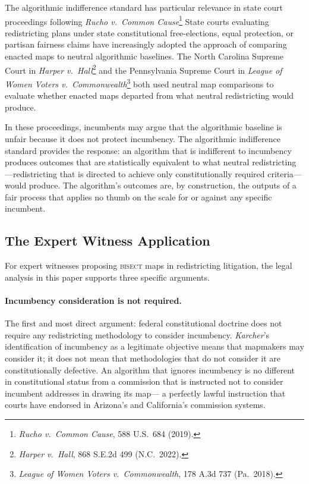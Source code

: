 The algorithmic indifference standard has particular relevance in state court proceedings
following \textit{Rucho v.\ Common Cause}\footnote{\textit{Rucho v.\ Common Cause},
588 U.S.\ 684 (2019).} State courts evaluating redistricting plans under state
constitutional free-elections, equal protection, or partisan fairness claims have
increasingly adopted the approach of comparing enacted maps to neutral algorithmic
baselines. The North Carolina Supreme Court in \textit{Harper v.\ Hall}\footnote{
\textit{Harper v.\ Hall}, 868 S.E.2d 499 (N.C.\ 2022).} and the Pennsylvania Supreme
Court in \textit{League of Women Voters v.\ Commonwealth}\footnote{\textit{League of
Women Voters v.\ Commonwealth}, 178 A.3d 737 (Pa.\ 2018).} both used neutral map
comparisons to evaluate whether enacted maps departed from what neutral redistricting
would produce.

In these proceedings, incumbents may argue that the algorithmic baseline is unfair
because it does not protect incumbency. The algorithmic indifference standard provides
the response: an algorithm that is indifferent to incumbency produces outcomes that
are statistically equivalent to what neutral redistricting---redistricting that is
directed to achieve only constitutionally required criteria---would produce. The
algorithm's outcomes are, by construction, the outputs of a fair process that applies
no thumb on the scale for or against any specific incumbent.

\subsection{The Expert Witness Application}

For expert witnesses proposing \textsc{bisect} maps in redistricting litigation, the
legal analysis in this paper supports three specific arguments.

\paragraph{Incumbency consideration is not required.}
The first and most direct argument: federal constitutional doctrine does not require
any redistricting methodology to consider incumbency. \textit{Karcher}'s identification
of incumbency as a legitimate objective means that mapmakers may consider it; it does
not mean that methodologies that do not consider it are constitutionally defective.
An algorithm that ignores incumbency is no different in constitutional status from a
commission that is instructed not to consider incumbent addresses in drawing its map---
a perfectly lawful instruction that courts have endorsed in Arizona's and California's
commission systems.

